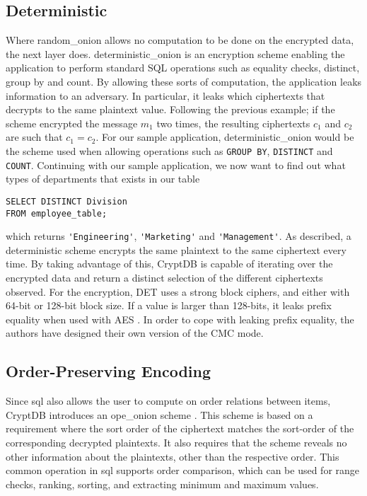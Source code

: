 \subsection{Deterministic}
Where \Gls{random_onion} allows no computation to be done on the encrypted data, the next layer does. \Gls{deterministic_onion} is an encryption scheme enabling the application to perform standard SQL operations such as equality checks, distinct, group by and count. By allowing these sorts of computation, the application leaks information to an adversary. In particular, it leaks which ciphertexts that decrypts to the same plaintext value. Following the previous example; if the scheme encrypted the message $m_1$ two times, the resulting ciphertexts $c_1$ and $c_2$ are such that $c_1 = c_2$. For our sample application, \Gls{deterministic_onion} would be the scheme used when allowing operations such as \verb!GROUP BY!, \verb!DISTINCT! and \verb!COUNT!. Continuing with our sample application, we now want to find out what types of departments that exists in our table

\begin{verbatim}
SELECT DISTINCT Division
FROM employee_table;
\end{verbatim}
\noindent
which returns \verb!'Engineering'!, \verb!'Marketing'! and \verb!'Management'!. As described, a deterministic scheme encrypts the same plaintext to the same ciphertext every time. By taking advantage of this, CryptDB is capable of iterating over the encrypted data and return a distinct selection of the different ciphertexts observed. For the encryption, DET uses a strong block ciphers, and either with 64-bit or 128-bit block size. If a value is larger than 128-bits, it leaks  prefix equality when used with AES \citep{CryptDB_Main_Paper}. In order to cope with leaking prefix equality, the authors have designed their own version of the CMC mode.


\subsection{Order-Preserving Encoding}

Since \Gls{sql} also allows the user to compute on order relations between items, CryptDB introduces an \Gls{ope_onion} scheme \citep{CryptDB_Main_Paper}. This scheme is based on a requirement where the sort order of the ciphertext matches the sort-order of the corresponding decrypted plaintexts. It also requires that the scheme reveals no other information about the plaintexts, other than the respective order. This common operation in \Gls{sql} supports order comparison, which can be used for range checks, ranking, sorting, and extracting minimum and maximum values. 

